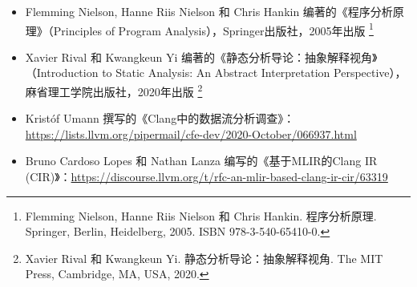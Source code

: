 
\begin{itemize}
\item
Flemming Nielson, Hanne Riis Nielson 和 Chris Hankin 编著的《程序分析原理》（Principles of Program Analysis），Springer出版社，2005年出版 \footnote{Flemming Nielson, Hanne Riis Nielson 和 Chris Hankin. 程序分析原理. Springer, Berlin, Heidelberg, 2005. ISBN 978-3-540-65410-0.}

\item
Xavier Rival 和 Kwangkeun Yi 编著的《静态分析导论：抽象解释视角》（Introduction to Static Analysis: An Abstract Interpretation Perspective），麻省理工学院出版社，2020年出版 \footnote{Xavier Rival 和 Kwangkeun Yi. 静态分析导论：抽象解释视角. The MIT Press, Cambridge, MA, USA, 2020.}

\item
Kristóf Umann 撰写的《Clang中的数据流分析调查》：\url{https://lists.llvm.org/pipermail/cfe-dev/2020-October/066937.html}

\item
Bruno Cardoso Lopes 和 Nathan Lanza 编写的《基于MLIR的Clang IR (CIR)》：\url{https://discourse.llvm.org/t/rfc-an-mlir-based-clang-ir-cir/63319}
\end{itemize}